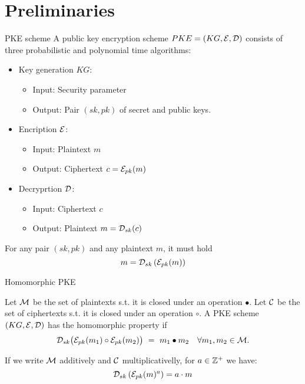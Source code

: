 \section{Preliminaries}

\begin{frame}{PKE scheme}
A public key encryption scheme $PKE = (KG, \mathcal{E}, \mathcal{D})$ consists of three probabilistic and polynomial time algorithms:
\begin{itemize}
\item Key generation $KG$:
\begin{itemize}
\item Input: Security parameter
\item Output: Pair $(sk,pk)$ of secret and public keys.
\end{itemize}
\item Encription $\mathcal{E}$:
\begin{itemize}
\item Input: Plaintext $m$
\item Output: Ciphertext $c = \mathcal{E}_{pk}(m)$
\end{itemize}
\item Decryprtion $\mathcal{D}$:
\begin{itemize}
\item Input: Ciphertext $c$
\item Output: Plaintext $m = \mathcal{D}_{sk}(c)$
\end{itemize}
\end{itemize}

For any pair $(sk,pk)$ and any plaintext $m$, it must hold $$m = \mathcal{D}_{sk} \left( \mathcal{E}_{pk} (m) \right)$$

\end{frame}


\begin{frame}{Homomorphic PKE}

\begin{defn}
Let $\mathcal{M}$ be the set of plaintexts s.t. it is closed under an operation $\bullet$. Let $\mathcal{C}$ be the set of ciphertexts s.t. it is closed under an operation $\circ$. A PKE scheme $(KG, \mathcal{E}, \mathcal{D})$ has the homomorphic property if
$$
\mathcal{D}_{sk} \big( \mathcal{E}_{pk}(m_1) \circ \mathcal{E}_{pk}(m_2) \big) \ = \ m_1 \bullet m_2 \quad \forall m_1,m_2 \in \mathcal{M}.
$$
\end{defn}

\begin{rmk}
If we write $\mathcal{M}$ additively and $\mathcal{C}$ multiplicativelly, for $a \in {\mathbb Z}^+$ we have:
$$
\mathcal{D}_{sk} \left( \mathcal{E}_{pk} (m)^a \right) = a \cdot m
$$

\end{rmk}


\end{frame}

